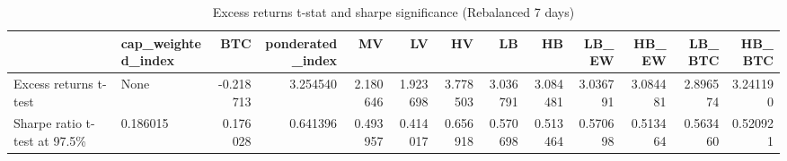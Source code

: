 \begin{table}
\centering
\caption{Excess returns t-stat and sharpe significance (Rebalanced 7 days)}
\label{signif20_7}
\begin{tabular}{llrrrrrrrrrrr}
\toprule
{} & cap\_weighted\_index &       BTC &  ponderated\_index &        MV &        LV &        HV &        LB &        HB &     LB\_EW &     HB\_EW &    LB\_BTC &    HB\_BTC \\
\midrule
Excess returns t-test        &               None & -0.218713 &          3.254540 &  2.180646 &  1.923698 &  3.778503 &  3.036791 &  3.084481 &  3.036791 &  3.084481 &  2.896574 &  3.241190 \\
Sharpe ratio t-test at 97.5\% &           0.186015 &  0.176028 &          0.641396 &  0.493957 &  0.414017 &  0.656918 &  0.570698 &  0.513464 &  0.570698 &  0.513464 &  0.563460 &  0.520921 \\
\bottomrule
\end{tabular}
\end{table}
